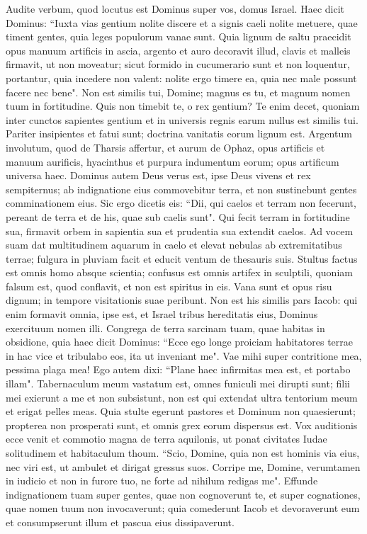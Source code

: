 \begin{biblechapter}  
\verse Audite verbum, quod locutus est Dominus super vos, domus Israel. 
\verse Haec dicit Dominus: “Iuxta vias gentium nolite discere et a signis caeli nolite metuere, quae timent gentes, 
\verse quia leges populorum vanae sunt. Quia lignum de saltu praecidit opus manuum artificis in ascia, 
\verse argento et auro decoravit illud, clavis et malleis firmavit, ut non moveatur; 
\verse sicut formido in cucumerario sunt et non loquentur, portantur, quia incedere non valent: nolite ergo timere ea, quia nec male possunt facere nec bene". 
\verse Non est similis tui, Domine; magnus es tu, et magnum nomen tuum in fortitudine. 
\verse Quis non timebit te, o rex gentium? Te enim decet, quoniam inter cunctos sapientes gentium et in universis regnis earum nullus est similis tui. 
\verse Pariter insipientes et fatui sunt; doctrina vanitatis eorum lignum est. 
\verse Argentum involutum, quod de Tharsis affertur, et aurum de Ophaz, opus artificis et manuum aurificis, hyacinthus et purpura indumentum eorum; opus artificum universa haec. 
\verse Dominus autem Deus verus est, ipse Deus vivens et rex sempiternus; ab indignatione eius commovebitur terra, et non sustinebunt gentes comminationem eius. 
\verse Sic ergo dicetis eis: “Dii, qui caelos et terram non fecerunt, pereant de terra et de his, quae sub caelis sunt". 
\verse Qui fecit terram in fortitudine sua, firmavit orbem in sapientia sua et prudentia sua extendit caelos. 
\verse Ad vocem suam dat multitudinem aquarum in caelo et elevat nebulas ab extremitatibus terrae; fulgura in pluviam facit et educit ventum de thesauris suis. 
\verse Stultus factus est omnis homo absque scientia; confusus est omnis artifex in sculptili, quoniam falsum est, quod conflavit, et non est spiritus in eis. 
\verse Vana sunt et opus risu dignum; in tempore visitationis suae peribunt. 
\verse Non est his similis pars Iacob: qui enim formavit omnia, ipse est, et Israel tribus hereditatis eius, Dominus exercituum nomen illi. 
\verse Congrega de terra sarcinam tuam, quae habitas in obsidione, 
\verse quia haec dicit Dominus: “Ecce ego longe proiciam habitatores terrae in hac vice et tribulabo eos, ita ut inveniant me". 
\verse Vae mihi super contritione mea, pessima plaga mea! Ego autem dixi: “Plane haec infirmitas mea est, et portabo illam". 
\verse Tabernaculum meum vastatum est, omnes funiculi mei dirupti sunt; filii mei exierunt a me et non subsistunt, non est qui extendat ultra tentorium meum et erigat pelles meas. 
\verse Quia stulte egerunt pastores et Dominum non quaesierunt; propterea non prosperati sunt, et omnis grex eorum dispersus est. 
\verse Vox auditionis ecce venit et commotio magna de terra aquilonis, ut ponat civitates Iudae solitudinem et habitaculum thoum. 
\verse “Scio, Domine, quia non est hominis via eius, nec viri est, ut ambulet et dirigat gressus suos. 
\verse Corripe me, Domine, verumtamen in iudicio et non in furore tuo, ne forte ad nihilum redigas me". 
\verse Effunde indignationem tuam super gentes, quae non cognoverunt te, et super cognationes, quae nomen tuum non invocaverunt; quia comederunt Iacob et devoraverunt eum et consumpserunt illum et pascua eius dissipaverunt. 
\end{biblechapter}

